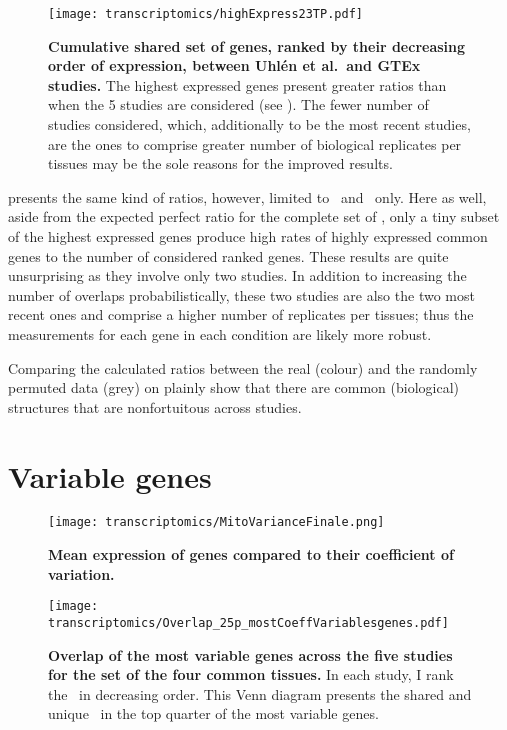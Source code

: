 \begin{figure}[htpb]
    \texttt{[image: transcriptomics/highExpress23TP.pdf]}\centering
    \caption[Cumulative shared set of genes, sorted by their expression, between
    Uhlen and GTEx]{\label{fig:highExpress23T}\textbf{Cumulative shared set of
    genes, ranked by their decreasing order of expression, between Uhlén et al.\
    and GTEx studies.}
    The highest expressed genes present greater ratios than
    when the 5 studies are considered (see ).
    The fewer number of studies considered, which, additionally to be the most
    recent studies, are the ones to comprise greater number of biological
    replicates per tissues may be the sole reasons for the improved results.}
\end{figure}

 presents the same kind of ratios,
however, limited to \uhlen\ and \gtex\ only.
Here as well, aside from the expected perfect ratio for the complete set of
\pcgs,
only a tiny subset of the highest expressed genes produce high rates of
highly expressed common genes to the number of considered ranked genes.
These results are quite unsurprising as they involve only two studies.
In addition to increasing the number of overlaps probabilistically,
these two studies are also the two most recent ones
and comprise a higher number of replicates per tissues;
thus the measurements for each gene in each condition are likely more robust.

Comparing the calculated ratios between the real (colour) and
the randomly permuted data (grey)
on 
plainly show that there are common (biological) structures
that are nonfortuitous across studies.

\section{Variable genes}

\begin{sidewaysfigure}[htpb]
    \texttt{[image: transcriptomics/MitoVarianceFinale.png]}\centering
    \caption[Mean expression of genes compared to their coefficient of variation]%
    {\label{fig:MitoVar}\textbf{Mean expression of genes compared to their
    coefficient of variation.}}
\end{sidewaysfigure}

\begin{figure}[!htpb]
    \texttt{[image: transcriptomics/Overlap\_25p\_mostCoeffVariablesgenes.pdf]}\centering
    \caption[Overlap of the most variables genes across the 5 studies for the set
    of four common tissues]{\label{fig:vennMostVar4T}\textbf{Overlap of the most
    variable genes across the five studies for the set of the four common tissues.}
    In each study, I rank the \pcgs\ in decreasing order.
    This Venn diagram presents the shared and unique \pcgs\ in the top
    quarter of the most variable genes.
    }
\end{figure}

